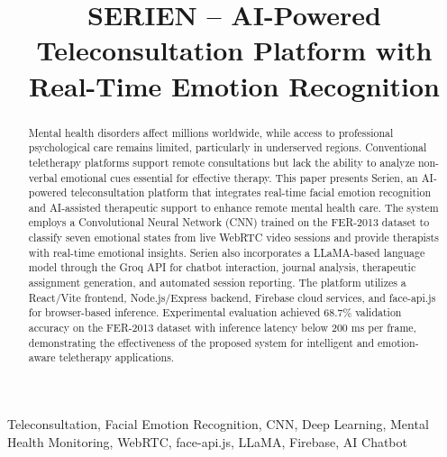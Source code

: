 \documentclass[conference]{IEEEtran}
\begin{document}
\title{SERIEN -- AI-Powered Teleconsultation Platform with Real-Time Emotion Recognition}
\author{}
\maketitle
\begin{abstract}
Mental health disorders affect millions worldwide, while access to professional psychological care remains limited, particularly in underserved regions. Conventional teletherapy platforms support remote consultations but lack the ability to analyze non-verbal emotional cues essential for effective therapy. This paper presents Serien, an AI-powered teleconsultation platform that integrates real-time facial emotion recognition and AI-assisted therapeutic support to enhance remote mental health care. The system employs a Convolutional Neural Network (CNN) trained on the FER-2013 dataset to classify seven emotional states from live WebRTC video sessions and provide therapists with real-time emotional insights. Serien also incorporates a LLaMA-based language model through the Groq API for chatbot interaction, journal analysis, therapeutic assignment generation, and automated session reporting. The platform utilizes a React/Vite frontend, Node.js/Express backend, Firebase cloud services, and face-api.js for browser-based inference. Experimental evaluation achieved 68.7\% validation accuracy on the FER-2013 dataset with inference latency below 200 ms per frame, demonstrating the effectiveness of the proposed system for intelligent and emotion-aware teletherapy applications.
\end{abstract}
\begin{IEEEkeywords}
Teleconsultation, Facial Emotion Recognition, CNN, Deep Learning, Mental Health Monitoring, WebRTC, face-api.js, LLaMA, Firebase, AI Chatbot
\end{IEEEkeywords}
\end{document}
